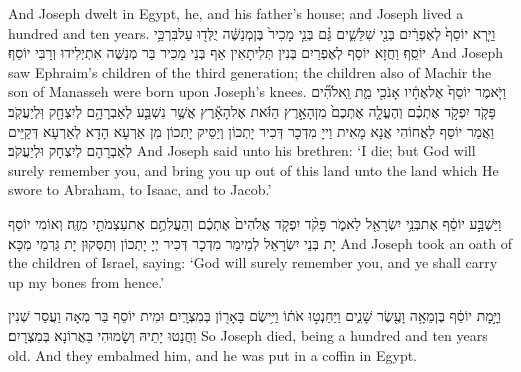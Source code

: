 {And Joseph dwelt in Egypt, he, and his father’s house; and Joseph lived a hundred and ten years.}{}
{וַיַּ֤רְא יוֹסֵף֙ לְאֶפְרַ֔יִם בְּנֵ֖י שִׁלֵּשִׁ֑ים גַּ֗ם בְּנֵ֤י מָכִיר֙ בֶּן\maqqaf מְנַשֶּׁ֔ה יֻלְּד֖וּ עַל\maqqaf בִּרְכֵּ֥י יוֹסֵֽף׃}
{וַחֲזָא יוֹסֵף לְאֶפְרַיִם בְּנִין תְּלִיתָאִין אַף בְּנֵי מָכִיר בַּר מְנַשֶּׁה אִתְיְלִידוּ וְרַבִּי יוֹסֵף׃}
{And Joseph saw Ephraim’s children of the third generation; the children also of Machir the son of Manasseh were born upon Joseph’s knees.}{}
{וַיֹּ֤אמֶר יוֹסֵף֙ אֶל\maqqaf אֶחָ֔יו אָנֹכִ֖י מֵ֑ת וֵֽאלֹהִ֞ים פָּקֹ֧ד יִפְקֹ֣ד אֶתְכֶ֗ם וְהֶעֱלָ֤ה אֶתְכֶם֙ מִן\maqqaf הָאָ֣רֶץ הַזֹּ֔את אֶל\maqqaf הָאָ֕רֶץ אֲשֶׁ֥ר נִשְׁבַּ֛ע לְאַבְרָהָ֥ם לְיִצְחָ֖ק וּֽלְיַעֲקֹֽב׃}
{וַאֲמַר יוֹסֵף לַאֲחוֹהִי אֲנָא מָאִית וַייָ מִדְכָר דְּכִיר יָתְכוֹן וְיַסֵּיק יָתְכוֹן מִן אַרְעָא הָדָא לְאַרְעָא דְּקַיֵּים לְאַבְרָהָם לְיִצְחָק וּלְיַעֲקֹב׃}
{And Joseph said unto his brethren: ‘I die; but God will surely remember you, and bring you up out of this land unto the land which He swore to Abraham, to Isaac, and to Jacob.’}{}

{וַיַּשְׁבַּ֣ע יוֹסֵ֔ף אֶת\maqqaf בְּנֵ֥י יִשְׂרָאֵ֖ל לֵאמֹ֑ר פָּקֹ֨ד יִפְקֹ֤ד אֱלֹהִים֙ אֶתְכֶ֔ם וְהַעֲלִתֶ֥ם אֶת\maqqaf עַצְמֹתַ֖י מִזֶּֽה׃}
{וְאוֹמִי יוֹסֵף יָת בְּנֵי יִשְׂרָאֵל לְמֵימַר מִדְכָר דְּכִיר יְיָ יָתְכוֹן וְתַסְּקוּן יָת גַּרְמַי מִכָּא׃}
{And Joseph took an oath of the children of Israel, saying: ‘God will surely remember you, and ye shall carry up my bones from hence.’}{}

{וַיָּ֣מׇת יוֹסֵ֔ף בֶּן\maqqaf מֵאָ֥ה וָעֶ֖שֶׂר שָׁנִ֑ים וַיַּחַנְט֣וּ אֹת֔וֹ וַיִּ֥ישֶׂם בָּאָר֖וֹן בְּמִצְרָֽיִם׃}
{וּמִית יוֹסֵף בַּר מְאָה וַעֲסַר שְׁנִין וַחֲנַטוּ יָתֵיהּ וְשָׂמוּהִי בַּאֲרוֹנָא בְּמִצְרָיִם׃}
{So Joseph died, being a hundred and ten years old. And they embalmed him, and he was put in a coffin in Egypt.}{}

\newperek
\chazak
